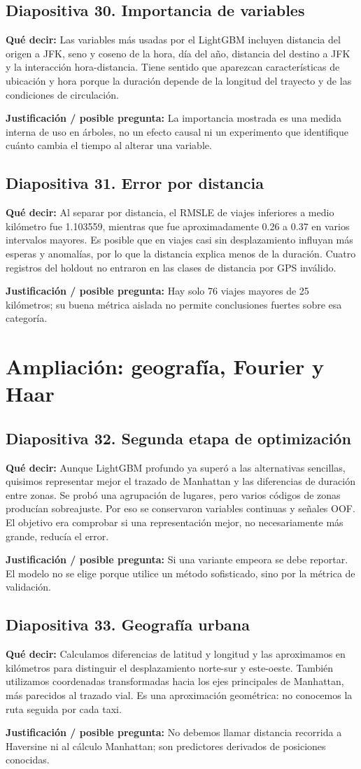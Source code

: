\documentclass[11pt,letterpaper]{article}
\newcommand{\lamina}[2]{\subsection*{Diapositiva #1. #2}}
\newcommand{\explica}[1]{\noindent\textcolor{azul}{\textbf{Qué decir:}} #1\par\smallskip}
\newcommand{\defiende}[1]{\noindent\textcolor{verde}{\textbf{Justificación / posible pregunta:}} #1\par\medskip}
\begin{document}
\lamina{30}{Importancia de variables}
\explica{Las variables más usadas por el LightGBM incluyen distancia del origen a JFK, seno y coseno de la hora, día del año, distancia del destino a JFK y la interacción hora-distancia. Tiene sentido que aparezcan características de ubicación y hora porque la duración depende de la longitud del trayecto y de las condiciones de circulación.}
\defiende{La importancia mostrada es una medida interna de uso en árboles, no un efecto causal ni un experimento que identifique cuánto cambia el tiempo al alterar una variable.}

\lamina{31}{Error por distancia}
\explica{Al separar por distancia, el RMSLE de viajes inferiores a medio kilómetro fue 1.103559, mientras que fue aproximadamente 0.26 a 0.37 en varios intervalos mayores. Es posible que en viajes casi sin desplazamiento influyan más esperas y anomalías, por lo que la distancia explica menos de la duración. Cuatro registros del holdout no entraron en las clases de distancia por GPS inválido.}
\defiende{Hay solo 76 viajes mayores de 25 kilómetros; su buena métrica aislada no permite conclusiones fuertes sobre esa categoría.}



\section{Ampliación: geografía, Fourier y Haar}

\lamina{32}{Segunda etapa de optimización}
\explica{Aunque LightGBM profundo ya superó a las alternativas sencillas, quisimos representar mejor el trazado de Manhattan y las diferencias de duración entre zonas. Se probó una agrupación de lugares, pero varios códigos de zonas producían sobreajuste. Por eso se conservaron variables continuas y señales OOF. El objetivo era comprobar si una representación mejor, no necesariamente más grande, reducía el error.}
\defiende{Si una variante empeora se debe reportar. El modelo no se elige porque utilice un método sofisticado, sino por la métrica de validación.}

\lamina{33}{Geografía urbana}
\explica{Calculamos diferencias de latitud y longitud y las aproximamos en kilómetros para distinguir el desplazamiento norte-sur y este-oeste. También utilizamos coordenadas transformadas hacia los ejes principales de Manhattan, más parecidos al trazado vial. Es una aproximación geométrica: no conocemos la ruta seguida por cada taxi.}
\defiende{No debemos llamar distancia recorrida a Haversine ni al cálculo Manhattan; son predictores derivados de posiciones conocidas.}
\end{document}
